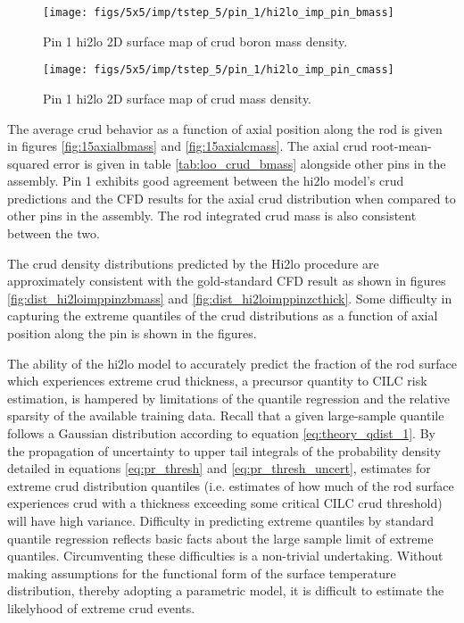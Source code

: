 \begin{figure}[H]
    \centering
    \texttt{[image: figs/5x5/imp/tstep\_5/pin\_1/hi2lo\_imp\_pin\_bmass]}
    \caption{Pin 1 hi2lo 2D surface map of crud boron mass density.}
    \label{fig:2d_hi2loimppinbmass}
\end{figure}
\begin{figure}[H]
    \centering
    \texttt{[image: figs/5x5/imp/tstep\_5/pin\_1/hi2lo\_imp\_pin\_cmass]}
    \caption{Pin 1 hi2lo 2D surface map of crud mass density.}
    \label{fig:2d_hi2loimppincmass}
\end{figure}

The average crud behavior as a function of axial position along the rod is given in figures \ref{fig:15axialbmass} and \ref{fig:15axialcmass}.  The axial crud root-mean-squared error is given in table \ref{tab:loo_crud_bmass} alongside other pins in the assembly.  Pin 1 exhibits good agreement between the hi2lo model's crud predictions and the CFD results for the axial crud distribution when compared to other pins in the assembly.  The rod integrated crud mass is also consistent between the two.

The crud density distributions predicted by the Hi2lo procedure are approximately consistent with the gold-standard CFD result as shown in figures \ref{fig:dist_hi2loimppinzbmass} and \ref{fig:dist_hi2loimppinzcthick}. Some difficulty in capturing the extreme quantiles of the crud distributions as a function of axial position along the pin is shown in the figures. 

The ability of the hi2lo model to accurately predict the fraction of the rod surface which experiences extreme crud thickness, a precursor quantity to CILC risk estimation, is hampered by limitations of the quantile regression and the relative sparsity of the available training data.  Recall that a given large-sample quantile follows a Gaussian distribution according to equation \ref{eq:theory_qdist_1}. By the propagation of uncertainty to upper tail integrals of the probability density detailed in equations \ref{eq:pr_thresh} and \ref{eq:pr_thresh_uncert}, estimates for extreme crud distribution quantiles (i.e. estimates of how much of the rod surface experiences crud with a thickness exceeding some critical CILC crud threshold) will have high variance.  Difficulty in predicting extreme quantiles by standard quantile regression reflects basic facts about the large sample limit of extreme quantiles.
Circumventing these difficulties is a non-trivial undertaking.  Without making assumptions for the functional form of the surface temperature distribution, thereby adopting a parametric model, it is difficult to estimate the likelyhood of extreme crud events.

